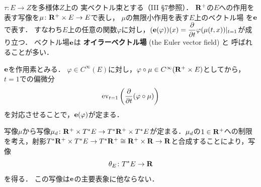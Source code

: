 \(\tau\colon E\to Z\)を多様体\(Z\)上の
実ベクトル束とする（III \S7参照）．
\(\rrp\)の\(E\)への作用を表す写像を\(
    \mu\colon \rrp\times E\to E
\)で表し，
\(\mu\)の無限小作用を表す\(E\)上のベクトル場
を\(\eu\)で表す．
すなわち\(E\)上の任意の関数\(\varphi\)に対し，\(
    (\eu(\varphi))(x)
    =
    \dfrac{\partial}{\partial{t}}\varphi(\mu(t,x))|_{t=1}
\)が成り立つ．
ベクトル場\(\eu\)は
\textbf{オイラーベクトル場} (the Euler vector field) と
呼ばれることが多い．
\begin{CMT}
    \(\eu\)を作用素とみる．
    \(\varphi\in C^{\infty}(E)\)に対し，\(
        \varphi\circ \mu\in C^{\infty}(\rrp \times E)
    \)としてから，\(t=1\)での偏微分\[
        \ev_{t=1}\left(\frac{\partial}{\partial t}(\varphi\circ \mu)\right)
    \]を対応させることで，\(\eu(\varphi)\)が定まる．
\end{CMT}
写像\(\mu\)から写像\(
    \mdiff[\mu]\colon
    \rrp\times\cotb[E]\to\cotb[\rrp]\times\cotb[E]
\)が定まる．\(\mdiff[\mu]\)の\(1\in\rrp\)への制限を考え，射影\(
    \cotb[\rrp]\times\cotb[E]
    \to
    \cotb[\rrp]\cong\rrp\times\rr\to\rr
\)と合成することにより，写像\begin{equation}
    \theta_{E}\colon\cotb[E]\to\rr
\end{equation}を得る．
この写像は\(\eu\)の主要表象に他ならない．
